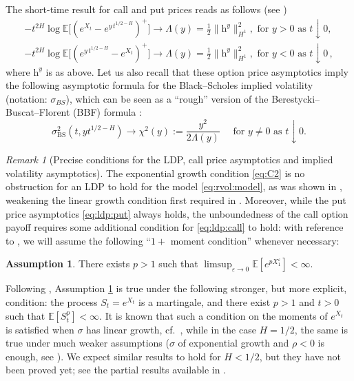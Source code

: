 \documentclass[11pt]{article}
\theoremstyle{plain}
\theoremstyle{definition}
\newtheorem{assumption}[theorem]{Assumption}
\theoremstyle{remark}
\newtheorem{remark}[theorem]{Remark}
\newcommand{\bE}{\mathbb{E}}
\newcommand{\1}{\mathbf{1}}
\numberwithin{equation}{section}
\def\eps{\varepsilon}
\def\h{\mathrm h}
\def\maj{>}
\def\mino{<}
\def\sigBS{\sigma_\mathrm{BS}}
\begin{document}
The short-time result for call and put prices reads as follows (see \cite[Corollary 4.13]{forde2017asymptotics})
\begin{align}
\label{eq:ldp:call}
     - t^{2H} \log \bE \bigl[ (e^{X_t} - e^{y \, t^{1/2-H}})^+ \bigr] \rightarrow \Lambda(y)= \frac{1}{2} \| { \h}^y  \|^2_{H^1} , \mbox{ for } y > 0 \mbox{ as } t \downarrow 0,
\\
\label{eq:ldp:put}
     - t^{2H} \log \bE \bigl[ (e^{y \, t^{1/2-H}}-e^{X_t})^+ \bigr] \rightarrow \Lambda(y)= \frac{1}{2} \| { \h}^y  \|^2_{H^1}, \mbox{ for } y < 0 \mbox{ as } t \downarrow 0 \,,
\end{align}
where $\h^y$ is as above.
Let us also recall that these option price asymptotics imply the following asymptotic formula for the Black--Scholes implied volatility 
(notation: $\sigma_{BS}$), which can be seen as a ``rough'' version of the Berestycki--Buscat--Florent (BBF)
formula \cite{berestycki2004computing}:
\begin{equation}\label{eq:asy:bs}
\sigBS^2(t, yt^{1/2-H} ) \to \chi^2(y):=\frac{y^2}{2\Lambda(y)}\quad 
\mbox{ for } y \neq 0 
\mbox{ as } t\downarrow 0.
\end{equation}

\begin{remark}[Precise conditions for the LDP, call price asymptotics and implied volatility asymptotics]\label{rm:condLDP}
The exponential growth condition \eqref{eq:C2} is no obstruction for an LDP to hold for the model \eqref{eq:rvol:model}, as was shown in \cite{bayer2017regularity, gulisashvili2017large}, 
weakening the linear growth condition first required in \cite{forde2017asymptotics}.
Moreover, while the put price asymptotics \eqref{eq:ldp:put} always holds, the unboundedness of the call option payoff requires some additional 
condition for \eqref{eq:ldp:call} to hold: with reference to \cite[Assumption A2]{friz2018precise1}, we will assume the following ``$1+$ moment condition'' whenever necessary:
\begin{assumption}
	\label{assu:moment}
	There exists $p \maj 1$ such that $\limsup_{\eps \to 0} \bE[e^{p X^\eps_1}] \mino \infty$.
\end{assumption}
Following \cite[Lemma 4.7]{friz2018precise1},  Assumption \ref{assu:moment} is true under the following stronger, but more explicit, condition: the process $S_t = e^{X_t}$ is a martingale, and there exist $p \maj 1$ and $t \maj 0$ such that $\bE [S_t^p] \mino \infty$.
It is known that such a condition on the moments of $e^{X_t}$ is satisfied when $\sigma$ has linear growth, cf.\ \cite{forde2017asymptotics}, while in the case $H=1/2$, the same is true under much weaker assumptions ($\sigma$ of exponential growth and $\rho <0$ is enough, see \cite{sin1998complications, jourdain2004loss}). We expect similar results to hold for $H<1/2$, but they have not been proved yet; see the partial results available in \cite{gassiat2018martingale, GULISASHVILI20203648}. 
\end{remark}
\end{document}
